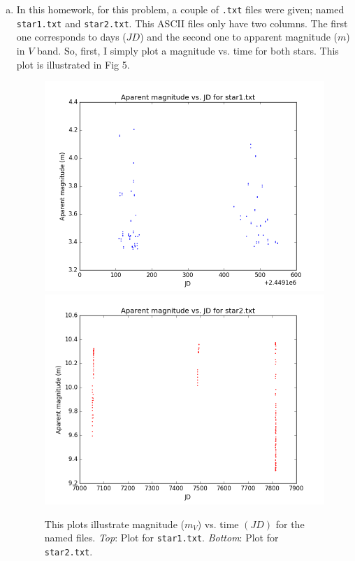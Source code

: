 \begin{enumerate} [a)]
\item In this homework, for this problem, a couple of \texttt{.txt} files were given; named \texttt{star1.txt} and \texttt{star2.txt}. This ASCII files only have two columns. The first one corresponds to days ($JD$) and the second one to apparent magnitude ($m$) in $V$ band. So, first, I simply plot a magnitude vs. time for both stars. This plot is illustrated in Fig 5.

 
\begin{figure}[tb]
\centering
\includegraphics[scale=0.5]{star1txt_simple_plot.png}
\includegraphics[scale=0.5]{star2txt_simple_plot.png}
\caption{This plots illustrate magnitude ($m_V$) vs. time $(JD)$ for the named files. \textit{Top}: Plot for \texttt{star1.txt}. \textit{Bottom}: Plot for \texttt{star2.txt}.} 
\label{fig:F1}
\end{figure}



\end{enumerate}
